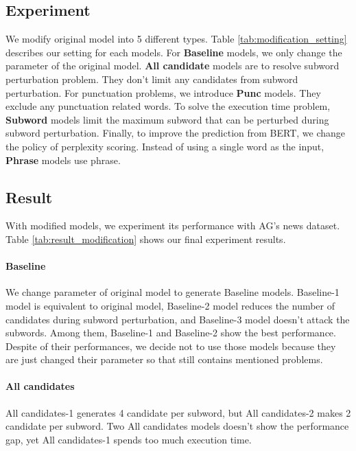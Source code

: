 \documentclass[11pt,a4paper]{article}
\begin{document}
\subsection{Experiment}

We modify original model into 5 different types.
Table \ref{tab:modification_setting} describes our setting for each models.
For \textbf{Baseline} models, we only change the parameter of the original model.
\textbf{All candidate} models are to resolve subword perturbation problem. They don't limit any candidates from subword perturbation.
For punctuation problems, we introduce \textbf{Punc} models. They exclude any punctuation related words.
To solve the execution time problem, \textbf{Subword} models limit the maximum subword that can be perturbed during subword perturbation.
Finally, to improve the prediction from BERT, we change the policy of perplexity scoring. Instead of using a single word as the input, \textbf{Phrase} models use phrase.



\subsection{Result}
\label{sec:improvement}
With modified models, we experiment its performance with AG's news dataset. 
Table \ref{tab:result_modification} shows our final experiment results.

\paragraph{Baseline} We change parameter of original model to generate Baseline models.
Baseline-1 model is equivalent to original model, Baseline-2 model reduces the number of candidates during subword perturbation, and Baseline-3 model doesn't attack the subwords.
Among them, Baseline-1 and Baseline-2 show the best performance.
Despite of their performances, we decide not to use those models because they are just changed their parameter so that still contains mentioned problems.

\paragraph{All candidates}
All candidates-1 generates 4 candidate per subword, but All candidates-2 makes 2 candidate per subword.
Two All candidates models doesn't show the performance gap, yet All candidates-1 spends too much execution time.
\end{document}
